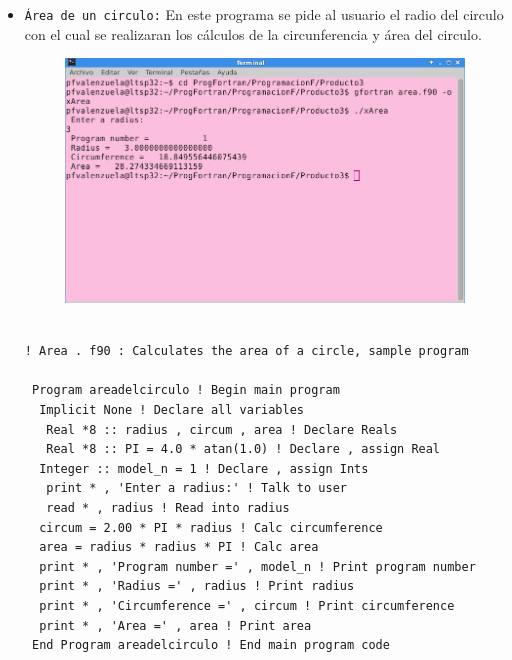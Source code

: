 \documentclass[12pt]{article}
\begin{document}
\begin{itemize}
\item {\tt Área de un circulo:} 
En este programa se pide al usuario el radio del circulo con el cual se realizaran los cálculos de la circunferencia y área del circulo.
\begin{figure}[h]
\centering
\includegraphics[scale=0.5]{area.png}
\end{figure}
\begin{verbatim}

! Area . f90 : Calculates the area of a circle, sample program

 Program areadelcirculo ! Begin main program
  Implicit None ! Declare all variables
   Real *8 :: radius , circum , area ! Declare Reals
   Real *8 :: PI = 4.0 * atan(1.0) ! Declare , assign Real
  Integer :: model_n = 1 ! Declare , assign Ints
   print * , 'Enter a radius:' ! Talk to user
   read * , radius ! Read into radius
  circum = 2.00 * PI * radius ! Calc circumference
  area = radius * radius * PI ! Calc area
  print * , 'Program number =' , model_n ! Print program number
  print * , 'Radius =' , radius ! Print radius
  print * , 'Circumference =' , circum ! Print circumference
  print * , 'Area =' , area ! Print area
 End Program areadelcirculo ! End main program code
 \end{verbatim}


\end{itemize}
\end{document}
